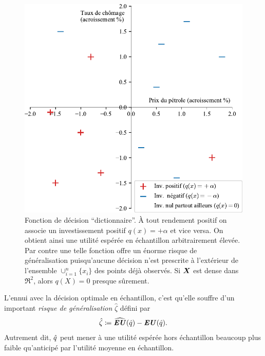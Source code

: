 \begin{figure}
  \centering
  \includegraphics[width=\textwidth]{../experiments/fig/pres/pres2_fr.pdf}
  \caption[Décision ``dictionnaire'']{Fonction de décision ``dictionnaire''. À tout
    rendement positif on associe un investissement positif $q(x)=+\alpha$ et vice versa. On
    obtient ainsi une utilité espérée en échantillon arbitrairement élevée. Par contre une
    telle fonction offre un énorme risque de généralisation puisqu'aucune décision n'est
    prescrite à l'extérieur de l'ensemble $\cup_{i=1}^n\{x_i\}$ des points déjà observés. Si
    $\bm{X}$ est dense dans $\Re^2$, alors $q(X)=0$ presque sûrement. }
  \label{fig_pres2}
\end{figure}

L'ennui avec la décision optimale en échantillon, c'est qu'elle souffre d'un important
\textit{risque de généralisation} $\hat\zeta$ défini par
\begin{equation}
  \hat\zeta \coloneqq \operatorname{\widehat{\operatorname{\mbox{\textbf{\textit{EU}}}}}}(\hat q) - \operatorname{\mbox{\textbf{\textit{EU}}}}(\hat q).
\end{equation}
Autrement dit, $\hat q$ peut mener à une utilité espérée hors échantillon beaucoup plus
faible qu'anticipé par l'utilité moyenne en échantillon.

